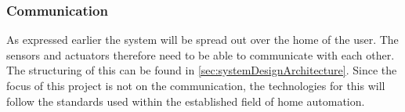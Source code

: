\subsubsection{Communication}
As expressed earlier the system will be spread out over the home of the user. The sensors and actuators therefore need to be able to communicate with each other. The structuring of this can be found in \cref{sec:systemDesignArchitecture}. Since the focus of this project is not on the communication, the technologies for this will follow the standards used within the established field of home automation.

